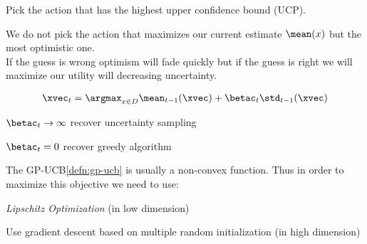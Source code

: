 \begin{principbox}\nospacing
  \begin{princip}\label{princip:optimization_in_the_phase_of_uncertainty}
    Pick the action that has the highest upper confidence bound (UCP).
  \end{princip}
\end{principbox}
\begin{explanationbox}
  \begin{explanation}
    We do not pick the action that maximizes our current estimate $\mean(x)$ but
    the most optimistic one.\\
    If the guess is wrong optimism will fade quickly but if the guess is right
    we will maximize our utility will decreasing uncertainty.
  \end{explanation}
\end{explanationbox}
\begin{defnbox}\nospacing
  \begin{defn}[GP-UCB]\label{defn:gp-ucb}
    \begin{align}
      \xvec_{t}=\argmax_{x\in D}\mean_{t-1}(\xvec)+\betac_{t}\std_{t-1}(\xvec)
    \end{align}
  \end{defn}
\end{defnbox}
\begin{explanationbox}
  \begin{explanation}\leavevmode
    \begin{itemizenosep}
      \item $\betac_{t}\to\infty$ recover uncertainty sampling
      \item $\betac_{t}=0$ recover greedy algorithm
    \end{itemizenosep}
  \end{explanation}
\end{explanationbox}
\label{subsubsubsec:maximizing_the_ucb}
\begin{sectionbox}\nospacing
  The GP-UCB\cref{defn:gp-ucb} is usually a non-convex function. Thus in order to maximize this objective
  we need to use:
  \begin{itemizenosep}
    \item \textit{Lipschitz Optimization} (in low dimension)
    \item Use gradient descent based on multiple random initialization (in high dimension)
  \end{itemizenosep}
\end{sectionbox}
